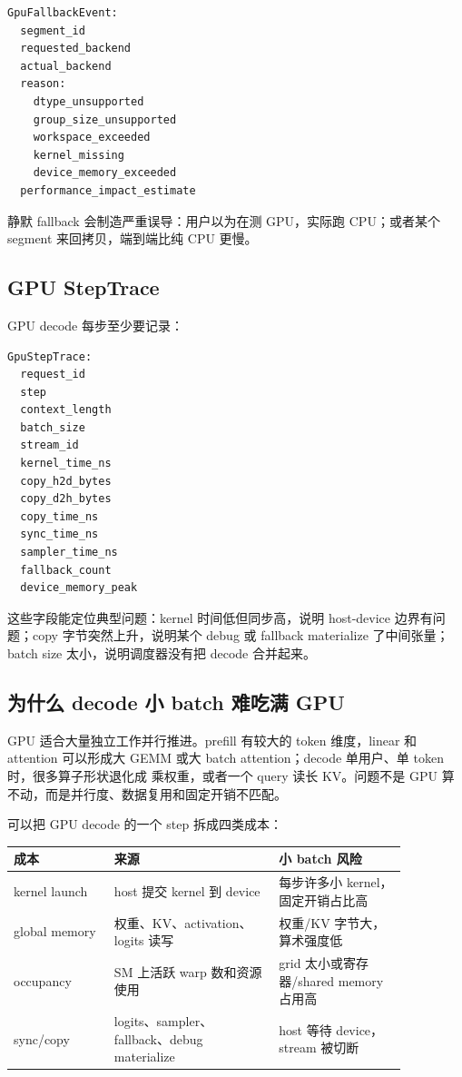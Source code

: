 \begin{lstlisting}[numbers=none,caption={GpuFallbackEvent 字段}]
GpuFallbackEvent:
  segment_id
  requested_backend
  actual_backend
  reason:
    dtype_unsupported
    group_size_unsupported
    workspace_exceeded
    kernel_missing
    device_memory_exceeded
  performance_impact_estimate
\end{lstlisting}

静默 fallback 会制造严重误导：用户以为在测 GPU，实际跑 CPU；或者某个 segment 来回拷贝，端到端比纯 CPU 更慢。

\subsection{GPU StepTrace}

GPU decode 每步至少要记录：

\begin{lstlisting}[numbers=none,caption={GPU StepTrace 字段}]
GpuStepTrace:
  request_id
  step
  context_length
  batch_size
  stream_id
  kernel_time_ns
  copy_h2d_bytes
  copy_d2h_bytes
  copy_time_ns
  sync_time_ns
  sampler_time_ns
  fallback_count
  device_memory_peak
\end{lstlisting}

这些字段能定位典型问题：kernel 时间低但同步高，说明 host-device 边界有问题；copy 字节突然上升，说明某个 debug 或 fallback materialize 了中间张量；batch size 太小，说明调度器没有把 decode 合并起来。

\subsection{为什么 decode 小 batch 难吃满 GPU}

GPU 适合大量独立工作并行推进。prefill 有较大的 token 维度，linear 和 attention 可以形成大 GEMM 或大 batch attention；decode 单用户、单 token 时，很多算子形状退化成 \code{[1,H]} 乘权重，或者一个 query 读长 KV。问题不是 GPU 算不动，而是并行度、数据复用和固定开销不匹配。

可以把 GPU decode 的一个 step 拆成四类成本：

\begin{center}
\begin{tabular}{p{0.22\linewidth}p{0.36\linewidth}p{0.28\linewidth}}
\toprule
成本 & 来源 & 小 batch 风险 \\
\midrule
kernel launch & host 提交 kernel 到 device & 每步许多小 kernel，固定开销占比高 \\
global memory & 权重、KV、activation、logits 读写 & 权重/KV 字节大，算术强度低 \\
occupancy & SM 上活跃 warp 数和资源使用 & grid 太小或寄存器/shared memory 占用高 \\
sync/copy & logits、sampler、fallback、debug materialize & host 等待 device，stream 被切断 \\
\bottomrule
\end{tabular}
\end{center}

